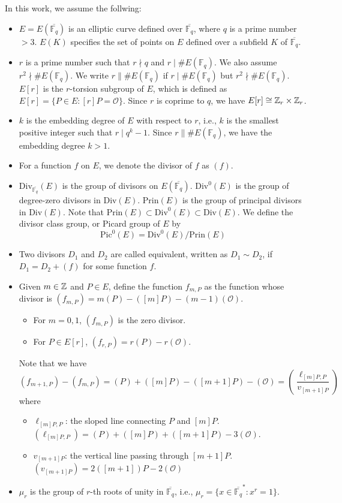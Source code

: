 In this work, we assume the follwing:
\begin{itemize}
	\item $E = E(\overline{\mathbb{F}_q})$ is an elliptic curve defined over $\overline{\mathbb{F}_{q}}$, where $q$ is a prime number $> 3$. $E(K)$ specifies the set of points on $E$ defined over a subfield $K$ of $\overline{\mathbb{F}_q}$.
		
	\item $r$ is a prime number such that $r \nmid q$ and $r \mid \#E(\mathbb{F}_q)$. We also assume $r^2 \nmid \#E(\mathbb{F}_q)$. We write $r \| \#E(\mathbb{F}_q)$ if $r \mid \#E(\mathbb{F}_q)$ but $r^2 \nmid \#E(\mathbb{F}_q)$. $E[r]$ is the $r$-torsion subgroup of $E$, which is defined as $E[r] = \{P \in E: [r]P = \mathcal{O}\}$. Since $r$ is coprime to $q$, we have $E[r] \cong \mathbb{Z}_r \times \mathbb{Z}_r$.
	\item $k$ is the embedding degree of $E$ with respect to $r$, i.e., $k$ is the smallest positive integer such that $r \mid q^k - 1$. Since $r \| \#E(\mathbb{F}_q)$, we have the embedding degree $k > 1$.
	\item For a function $f$ on $E$, we denote the divisor of $f$ as $(f)$.
	\item $\text{Div}_{\overline{\mathbb{F}_q}}(E)$ is the group of divisors on $E(\overline{\mathbb{F}_q})$. $\text{Div}^0(E)$ is the group of degree-zero divisors in $\text{Div}(E)$. $\text{Prin}(E)$ is the group of principal divisors in $\text{Div}(E)$. Note that $\text{Prin}(E) \subset \text{Div}^0(E) \subset \text{Div}(E)$. We define the divisor class group, or Picard group of $E$ by
	\[
		\text{Pic}^{0}(E) = \text{Div}^0(E) / \text{Prin}(E)
	\]
	\item Two divisors $D_1$ and $D_2$ are called equivalent, written as $D_1 \sim D_2$, if $D_1 = D_2 + (f)$ for some function $f$.
	\item Given $m \in \mathbb{Z}$ and $P \in E$, define the function $f_{m, P}$ as the function whose divisor is $(f_{m,P}) = m(P) - ([m]P) - (m-1)(\mathcal{O})$.
	\begin{itemize}
		\item For $m = 0, 1$, $(f_{m,P})$ is the zero divisor.
		\item For $P \in E[r]$, $(f_{r,P}) = r(P) - r(\mathcal{O})$.
	\end{itemize}
	Note that we have
	\[
		(f_{m+1,P}) - (f_{m, P}) = (P) + ([m]P) - ([m+1]P) - (\mathcal{O}) = (\frac{\ell_{[m]P, P}}{v_{[m+1]P}})
	\]
	where
	\begin{itemize}
		\item $\ell_{[m]P, P}$: the sloped line connecting $P$ and $[m]P$. $(\ell_{[m]P, P}) = (P) + ([m]P) + ([m+1]P) - 3 (\mathcal{O})$.
		\item $v_{[m+1]P}$: the vertical line passing through $[m+1]P$. $(v_{[m+1]P}) = 2([m+1])P - 2 (\mathcal{O})$
	\end{itemize}
	\item $\mu_r$ is the group of $r$-th roots of unity in $\overline{\mathbb{F}_q}$, i.e., $\mu_r = \{x \in \overline{\mathbb{F}_q}^* : x^r = 1\}$.
\end{itemize}

